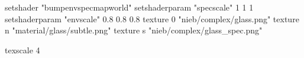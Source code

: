 setshader "bumpenvspecmapworld"
setshaderparam "specscale" 1 1 1
setshaderparam "envscale"  0.8 0.8 0.8
   texture 0 "nieb/complex/glass.png"
   texture n "material/glass/subtle.png"
   texture s "nieb/complex/glass_spec.png"

texscale 4
